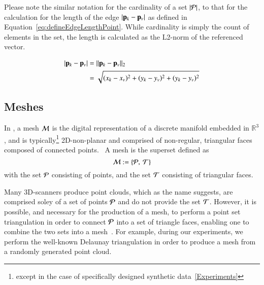 Please note the similar notation for the cardinality of a set $|\mathcal{P}|$, to that for the calculation for the length of the edge $|\mathbf{p}_k - \mathbf{p}_v|$ as defined in Equation~\ref{eq:defineEdgeLengthPoint}. While cardinality is simply the count of elements in the set, the length is calculated as the L2-norm of the referenced vector.~\cite[p.~26]{Mara12}

\begin{equation}
\begin{aligned}
	|\mathbf{p}_k - \mathbf{p}_v| & = \lVert\mathbf{p}_k - \mathbf{p}_v\rVert_2 \\
					& = \sqrt{(x_k-x_v)^2 + (y_k-y_v)^2 + (y_k-y_v)^2}
	\label{eq:defineEdgeLengthCalc}
\end{aligned}
\end{equation}

%
%
%
\subsection{Meshes}
\label{ch2s3ssM}
In \tdd{}, a mesh $\mathcal{M}$ is the digital representation of a discrete manifold embedded in $\mathbb{R}^3$, and is typically\footnote{except in the case of specifically designed synthetic data~\ref{Experiments}} 2D-non-planar and comprised of non-regular, triangular faces composed of connected points.~\cite[p.~25]{Mara12} A mesh is the superset defined as
%
\begin{equation}
	\mathcal{M} := \left \{\mathcal{P},\:\mathcal{T}\right \}
	\label{eq:defineMesh}
\end{equation}%
%
%
with the set $\mathcal{P}$ consisting of points, and the set $\mathcal{T}$ consisting of triangular faces.

Many 3D-scanners produce point clouds\todoCitation{}{}, which as the name suggests, are comprised soley of a set of points $\mathcal{P}$ and do not provide the set $\mathcal{T}$. However, it is possible, and necessary for the production of a mesh, to perform a point set triangulation\todoCitation{}{} in order to connect $\mathcal{P}$ into a set of triangle faces, enabling one to combine the two sets into a mesh~\cite[p.~26]{Mara12}. For example, during our experiments, we perform the well-known Delaunay triangulation\todoCitation{} in order to produce a mesh from a randomly generated point cloud.

